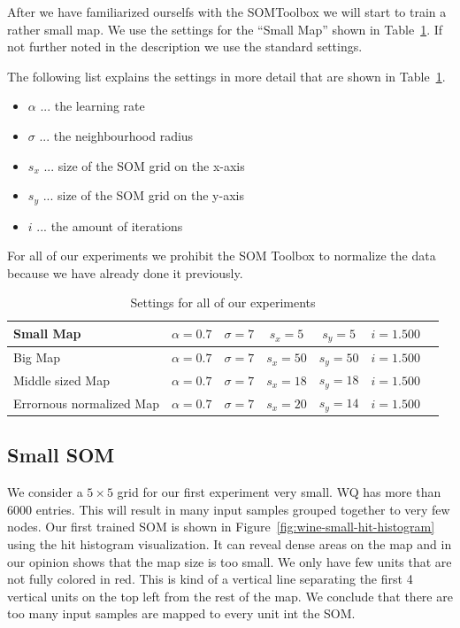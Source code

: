 \documentclass{acm_proc_article-sp}
\begin{document}
After we have familiarized ourselfs with the SOMToolbox we will start to train a rather small
map. We use the settings for the ``Small Map'' shown in Table~\ref{tab:settings}. If not further
noted in the description we use the standard settings.

The following list explains the settings in more detail that are shown in Table~\ref{tab:settings}.

\begin{itemize}
    \item $\alpha$ ... the learning rate
    \item $\sigma$ ... the neighbourhood radius
    \item $s_x$ ... size of the SOM grid on the x-axis
    \item $s_y$ ... size of the SOM grid on the y-axis
    \item $i$ ... the amount of iterations
\end{itemize}

For all of our experiments we prohibit the SOM Toolbox to normalize the data because we have
already done it previously.

\begin{table}
\centering
\begin{tabular}{|l|c|c|c|c|c|c|}
    \hline
    Small Map & $\alpha = 0.7$ & $\sigma = 7$ & $s_x=5$ & $s_y=5$ & $i=1.500$ \\
    \hline
    Big Map & $\alpha = 0.7$ & $\sigma = 7$ & $s_x=50$ & $s_y=50$ & $i=1.500$ \\
    \hline
    Middle sized Map & $\alpha = 0.7$ & $\sigma = 7$ & $s_x=18$ & $s_y=18$ & $i=1.500$ \\
    \hline
    Errornous normalized Map & $\alpha = 0.7$ & $\sigma = 7$ & $s_x=20$ & $s_y=14$ & $i=1.500$ \\
    \hline
\end{tabular}
\caption{Settings for all of our experiments}
\label{tab:settings}
\end{table}

\subsection{Small SOM}

We consider a $5\times5$ grid for our first experiment very small. WQ has more than 6000 entries.
This will result in many input samples grouped together to very few nodes. Our first trained
SOM is shown in Figure~\ref{fig:wine-small-hit-histogram} using the hit histogram visualization.
It can reveal dense areas on the map and in our opinion shows that the map size is too small.
We only have few units that are not fully colored in red. This is kind of a vertical line separating
the first 4 vertical units on the top left from the rest of the map. We conclude that there are
too many input samples are mapped to every unit int the SOM.
\end{document}
